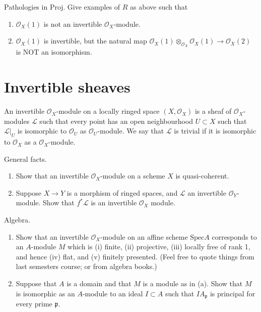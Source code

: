 \begin{exercise}
Pathologies in $\text{Proj}$. 
Give examples of $R$ as above such that
\begin{enumerate}
\item ${\mathcal O}_X(1)$ is not an invertible ${\mathcal O}_X$-module.
\item ${\mathcal O}_X(1)$ is invertible, but the
natural map ${\mathcal O}_X(1) \otimes_{{\mathcal O}_X} {\mathcal O}_X(1) \to
{\mathcal O}_X(2)$ is NOT an isomorphism.
\end{enumerate}
\end{exercise}



\section{Invertible sheaves}
\label{section-invertible-sheaves}

\noindent
An invertible ${\mathcal O}_X$-module on a locally
ringed space $(X,{\mathcal O}_X)$
is a sheaf of ${\mathcal O}_X$-modules ${\mathcal L}$ such that every point
has an open neighbourhood $U \subset X$ such that ${\mathcal L}|_U$
is isomorphic to ${\mathcal O}_U$ as ${\mathcal O}_U$-module.
We say that ${\mathcal L}$ is trivial if it is isomorphic to 
${\mathcal O}_X$ as a ${\mathcal O}_X$-module.

\begin{exercise}
General facts.
\begin{enumerate}
\item Show that an invertible ${\mathcal O}_X$-module on 
a scheme $X$ is quasi-coherent.
\item Suppose $X\to Y$ is a morphism of ringed spaces,
and ${\mathcal L}$ an invertible ${\mathcal O}_Y$-module.
Show that $f^\ast {\mathcal L}$ is an invertible ${\mathcal O}_X$ module.
\end{enumerate}
\end{exercise}

\begin{exercise}
Algebra.
\begin{enumerate}
\item Show that an invertible ${\mathcal O}_X$-module on 
an affine scheme $\text{Spec} A$ corresponds to an $A$-module $M$ which is
(i) finite, (ii) projective, (iii) locally free of rank 1,
and hence (iv) flat, and (v) finitely presented. (Feel free to
quote things from last semesters course; or from algebra books.)
\item Suppose that $A$ is a domain and that $M$ is
a module as in (a). Show that $M$ is isomorphic as an $A$-module
to an ideal $I \subset A$ such that $IA_{\mathfrak p}$ is principal for
every prime ${\mathfrak p}$.
\end{enumerate}
\end{exercise}

